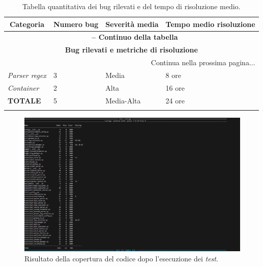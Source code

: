 \begin{center}
\begin{longtable}{|p{}|p{}|p{}|p{}|}
\hline
\multicolumn{1}{|c|}{\textbf{Categoria}} & 
\multicolumn{1}{c|}{\textbf{Numero bug}} & 
\multicolumn{1}{c|}{\textbf{Severità media}} & 
\multicolumn{1}{c|}{\textbf{Tempo medio risoluzione}} \\ 
\hline
\endfirsthead

\multicolumn{4}{c}{{\bfseries \tablename\ \thetable{} -- Continuo della tabella}}\\
\hline
\multicolumn{4}{|c|}{\textbf{Bug rilevati e metriche di risoluzione}} \\ \hline
\endhead

\hline \multicolumn{4}{|r|}{{Continua nella prossima pagina...}} \\ \hline
\endfoot

\endlastfoot

\textit{Parser regex} & 3 & Media & 8 ore \\ \hline
\textit{Container} & 2 & Alta & 16 ore \\ \hline
\textbf{TOTALE} & 5 & Media-Alta & 24 ore \\ \hline

\caption{Tabella quantitativa dei bug rilevati e del tempo di risoluzione medio.}
\label{tab:bug-metriche}
\end{longtable}
\end{center}


\begin{figure}[H]
    \begin{center}
    \includegraphics[width=\textwidth]{img/code-coverage.png}
    \caption{Risultato della copertura del codice dopo l'esecuzione dei \textit{test}.}
    \label{fig:coverage}
    \end{center}
\end{figure}
